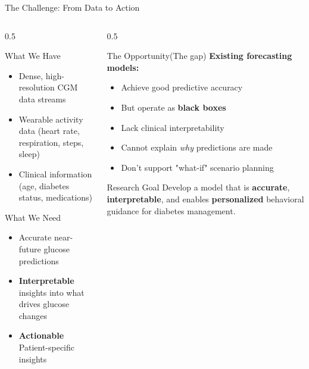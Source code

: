 \documentclass[aspectratio=169,xcolor=dvipsnames]{beamer}
\begin{document}
\begin{frame}{The Challenge: From Data to Action}
    \begin{columns}
        \begin{column}{0.5\textwidth}
            \begin{block}{What We Have}
                \begin{itemize}
                    \item Dense, high-resolution CGM data streams
                    \item Wearable activity data (heart rate, respiration, steps, sleep)
                    \item Clinical information (age, diabetes status, medications)
                \end{itemize}
            \end{block}
            
            \begin{block}{What We Need}
                \begin{itemize}
                    \item Accurate near-future glucose predictions 
                    \item \textbf{Interpretable} insights into what drives glucose changes
                    \item \textbf{Actionable} Patient-specific insights
                \end{itemize}
            \end{block}
        \end{column}
        
        \begin{column}{0.5\textwidth}
            \begin{block}{The Opportunity(The gap)}
                \textbf{Existing forecasting models:}
                \begin{itemize}
                    \item Achieve good predictive accuracy
                    \item But operate as \textbf{black boxes}
                    \item Lack clinical interpretability
                    \item Cannot explain \textit{why} predictions are made
                    \item Don't support "what-if" scenario planning
                \end{itemize}
            \end{block}
            
             
            \begin{alertblock}{Research Goal}
                Develop a model that is \textbf{accurate}, \textbf{interpretable}, and enables \textbf{personalized} behavioral guidance for diabetes management.
            \end{alertblock}
        \end{column}
    \end{columns}
\end{frame}
\end{document}
